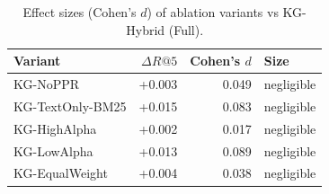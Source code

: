 \begin{table}[t]
\centering
\caption{Effect sizes (Cohen's $d$) of ablation variants vs KG-Hybrid (Full).}
\label{tab:effect-sizes}
\begin{tabular}{lrrl}
\toprule
Variant & $\Delta R@5$ & Cohen's $d$ & Size \\
\midrule
KG-NoPPR & +0.003 & 0.049 & negligible \\
KG-TextOnly-BM25 & +0.015 & 0.083 & negligible \\
KG-HighAlpha & +0.002 & 0.017 & negligible \\
KG-LowAlpha & +0.013 & 0.089 & negligible \\
KG-EqualWeight & +0.004 & 0.038 & negligible \\
\bottomrule
\end{tabular}
\end{table}